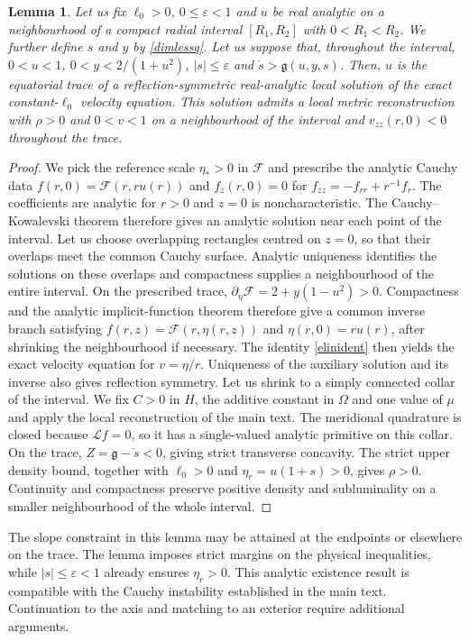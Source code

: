 \documentclass[amsmath,amsfonts,amssymb,aps,pra,superscriptaddress,10pt]{revtex4-2}
\numberwithin{equation}{section}
\theoremstyle{plain}
\newtheorem{lemma}{Lemma}
\theoremstyle{definition}
\theoremstyle{remark}
\theoremstyle{definition}
\newcommand{\ellzero}{\ell_0}
\begin{document}
\begin{lemma}
Let us fix $\ellzero>0$, $0\leq\varepsilon<1$ and $u$ be real analytic on a neighbourhood of a compact radial interval $[R_1,R_2]$ with $0<R_1<R_2$. We further define $s$ and $y$ by \eqref{dimlessq}. Let us suppose that, throughout the interval, $0<u<1$, $0<y<2/(1+u^2)$, $|s|\leq\varepsilon$ and $\dot{s}>\mathfrak{g}(u,y,s)$. Then, $u$ is the equatorial trace of a reflection-symmetric real-analytic local solution of the exact constant-$\ellzero$ velocity equation. This solution admits a local metric reconstruction with $\rho>0$ and $0<v<1$ on a neighbourhood of the interval and $v_{zz}(r,0)<0$ throughout the trace.
\end{lemma}

\begin{proof}
We pick the reference scale $\eta_*>0$ in $\mathcal{F}$ and prescribe the analytic Cauchy data $f(r,0)=\mathcal{F}(r,ru(r))$ and $f_z(r,0)=0$ for $f_{zz}=-f_{rr}+r^{-1}f_r$. The coefficients are analytic for $r>0$ and $z=0$ is noncharacteristic. The Cauchy--Kowalevski theorem therefore gives an analytic solution near each point of the interval. Let us choose overlapping rectangles centred on $z=0$, so that their overlaps meet the common Cauchy surface. Analytic uniqueness identifies the solutions on these overlaps and compactness supplies a neighbourhood of the entire interval. On the prescribed trace, $\partial_\eta\mathcal{F}=2+y(1-u^2)>0$. Compactness and the analytic implicit-function theorem therefore give a common inverse branch satisfying $f(r,z)=\mathcal{F}(r,\eta(r,z))$ and $\eta(r,0)=ru(r)$, after shrinking the neighbourhood if necessary. The identity \eqref{elinident} then yields the exact velocity equation for $v=\eta/r$. Uniqueness of the auxiliary solution and its inverse also gives reflection symmetry. Let us shrink to a simply connected collar of the interval. We fix $C>0$ in $H$, the additive constant in $\Omega$ and one value of $\mu$ and apply the local reconstruction of the main text. The meridional quadrature is closed because $\mathcal{L}f=0$, so it has a single-valued analytic primitive on this collar. On the trace, $Z=\mathfrak{g}-\dot{s}<0$, giving strict transverse concavity. The strict upper density bound, together with $\ellzero>0$ and $\eta_r=u(1+s)>0$, gives $\rho>0$. Continuity and compactness preserve positive density and subluminality on a smaller neighbourhood of the whole interval.
\end{proof}

The slope constraint in this lemma may be attained at the endpoints or elsewhere on the trace. The lemma imposes strict margins on the physical inequalities, while $|s|\leq\varepsilon<1$ already ensures $\eta_r>0$. This analytic existence result is compatible with the Cauchy instability established in the main text. Continuation to the axis and matching to an exterior require additional arguments.
\end{document}
